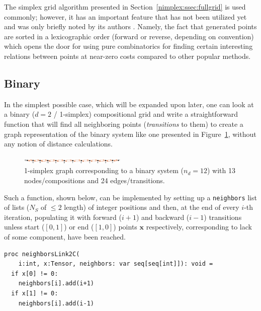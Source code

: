 The simplex grid algorithm presented in Section~\ref{nimplex:ssec:fullgrid} is used commonly; however, it has an important feature that has not been utilized yet and was only briefly noted by its authors \cite{Chasalow1995AlgorithmPoints}. Namely, the fact that generated points are sorted in a lexicographic order (forward or reverse, depending on convention) which opens the door for using pure combinatorics for finding certain interesting relations between points at near-zero costs compared to other popular methods.

\subsection{Binary} \label{nimplex:ssec:binarygraph}

In the simplest possible case, which will be expanded upon later, one can look at a binary ($d=2$ / 1-simplex) compositional grid and write a straightforward function that will find all neighboring points (\emph{transitions} to them) to create a graph representation of the binary system like one presented in Figure~\ref{nimplex:fig:binarysimplexgraph}, without any notion of distance calculations.

\begin{figure}[H]
    \centering
    \includegraphics[width=0.45\textwidth]{nimplex/SimplexGraphBinary.png}
    \caption{1-simplex graph corresponding to a binary system ($n_d=12$) with 13 nodes/compositions and 24 edges/transitions.} 
    \label{nimplex:fig:binarysimplexgraph}
\end{figure}

Such a function, shown below, can be implemented by setting up a \texttt{neighbors} list of lists ($N_S$ of $\leq2$ length) of integer positions and then, at the end of every $i$-th iteration, populating it with forward ($i+1$) and backward ($i-1$) transitions unless start ($[0,1]$) or end ($[1,0]$) points $\textbf{x}$ respectively, corresponding to lack of some component, have been reached.


\begin{verbatim}
proc neighborsLink2C(
    i:int, x:Tensor, neighbors: var seq[seq[int]]): void =
  if x[0] != 0:
    neighbors[i].add(i+1)
  if x[1] != 0:
    neighbors[i].add(i-1)
\end{verbatim}

